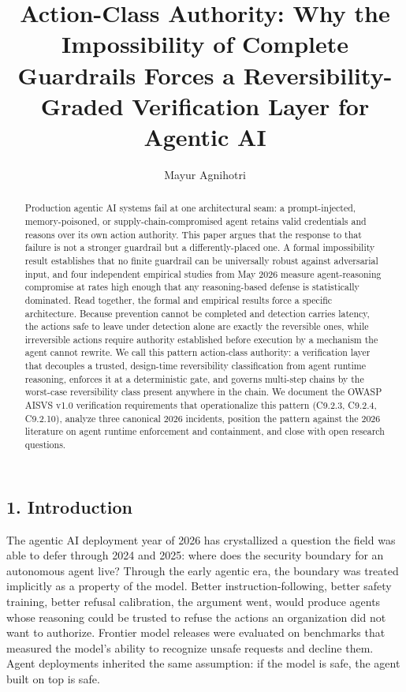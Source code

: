 \documentclass[
  11pt,
]{article}
\title{Action-Class Authority: Why the Impossibility of Complete
Guardrails Forces a Reversibility-Graded Verification Layer for Agentic
AI}
\author{Mayur Agnihotri}
\date{}
\begin{document}
\maketitle
\begin{abstract}
Production agentic AI systems fail at one architectural seam: a
prompt-injected, memory-poisoned, or supply-chain-compromised agent
retains valid credentials and reasons over its own action authority.
This paper argues that the response to that failure is not a stronger
guardrail but a differently-placed one. A formal impossibility result
establishes that no finite guardrail can be universally robust against
adversarial input, and four independent empirical studies from May 2026
measure agent-reasoning compromise at rates high enough that any
reasoning-based defense is statistically dominated. Read together, the
formal and empirical results force a specific architecture. Because
prevention cannot be completed and detection carries latency, the
actions safe to leave under detection alone are exactly the reversible
ones, while irreversible actions require authority established before
execution by a mechanism the agent cannot rewrite. We call this pattern
action-class authority: a verification layer that decouples a trusted,
design-time reversibility classification from agent runtime reasoning,
enforces it at a deterministic gate, and governs multi-step chains by
the worst-case reversibility class present anywhere in the chain. We
document the OWASP AISVS v1.0 verification requirements that
operationalize this pattern (C9.2.3, C9.2.4, C9.2.10), analyze three
canonical 2026 incidents, position the pattern against the 2026
literature on agent runtime enforcement and containment, and close with
open research questions.
\end{abstract}

\subsection{1. Introduction}\label{introduction}

The agentic AI deployment year of 2026 has crystallized a question the
field was able to defer through 2024 and 2025: where does the security
boundary for an autonomous agent live? Through the early agentic era,
the boundary was treated implicitly as a property of the model. Better
instruction-following, better safety training, better refusal
calibration, the argument went, would produce agents whose reasoning
could be trusted to refuse the actions an organization did not want to
authorize. Frontier model releases were evaluated on benchmarks that
measured the model's ability to recognize unsafe requests and decline
them. Agent deployments inherited the same assumption: if the model is
safe, the agent built on top is safe.
\end{document}
